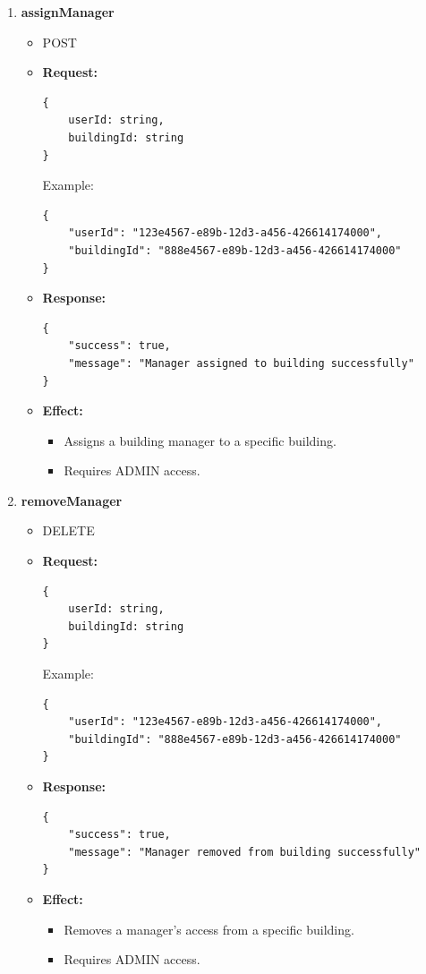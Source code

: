 \documentclass[12pt, a4paper]{article}
\begin{document}
\begin{enumerate}
\begin{itemize}
        \begin{itemize}
            \item Fetches all users with the BUILDING\_MANAGER role and their assigned building IDs.
            \item Requires ADMIN access.
        \end{itemize}
    \end{itemize}
    \item \textbf{assignManager}
    \begin{itemize}
        \item POST 
        \item \textbf{Request:}
        \begin{verbatim}
{
    userId: string,
    buildingId: string
}
        \end{verbatim}
        Example:
        \begin{verbatim}
{
    "userId": "123e4567-e89b-12d3-a456-426614174000",
    "buildingId": "888e4567-e89b-12d3-a456-426614174000"
}
        \end{verbatim}
        \item \textbf{Response:}
        \begin{verbatim}
{
    "success": true,
    "message": "Manager assigned to building successfully"
}
        \end{verbatim}
        \item \textbf{Effect:}
        \begin{itemize}
            \item Assigns a building manager to a specific building.
            \item Requires ADMIN access.
        \end{itemize}
    \end{itemize}
    \item \textbf{removeManager}
    \begin{itemize}
        \item DELETE
        \item \textbf{Request:}
        \begin{verbatim}
{
    userId: string,
    buildingId: string
}
        \end{verbatim}
        Example:
        \begin{verbatim}
{
    "userId": "123e4567-e89b-12d3-a456-426614174000",
    "buildingId": "888e4567-e89b-12d3-a456-426614174000"
}
        \end{verbatim}
        \item \textbf{Response:}
        \begin{verbatim}
{
    "success": true,
    "message": "Manager removed from building successfully"
}
        \end{verbatim}
        \item \textbf{Effect:}
        \begin{itemize}
            \item Removes a manager's access from a specific building.
            \item Requires ADMIN access.
        \end{itemize}
    \end{itemize}
\end{enumerate}
\end{document}
